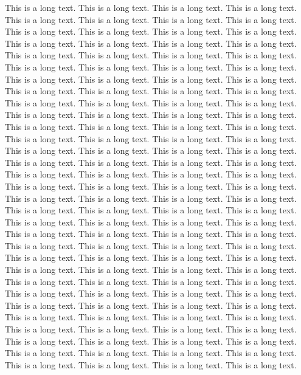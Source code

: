 \documentclass[twoside]{article}
\begin{document}
This is a long text. This is a long text.
This is a long text. This is a long text.
This is a long text. This is a long text.
This is a long text. This is a long text.
This is a long text. This is a long text.
This is a long text. This is a long text.
This is a long text. This is a long text.
This is a long text. This is a long text.
This is a long text. This is a long text.
This is a long text. This is a long text.
This is a long text. This is a long text.
This is a long text. This is a long text.
This is a long text. This is a long text.
This is a long text. This is a long text.
This is a long text. This is a long text.
This is a long text. This is a long text.
This is a long text. This is a long text.
This is a long text. This is a long text.
This is a long text. This is a long text.
This is a long text. This is a long text.
This is a long text. This is a long text.
This is a long text. This is a long text.
This is a long text. This is a long text.
This is a long text. This is a long text.
This is a long text. This is a long text.
This is a long text. This is a long text.
This is a long text. This is a long text.
This is a long text. This is a long text.
This is a long text. This is a long text.
This is a long text. This is a long text.
This is a long text. This is a long text.
This is a long text. This is a long text.
This is a long text. This is a long text.
This is a long text. This is a long text.
This is a long text. This is a long text.
This is a long text. This is a long text.
This is a long text. This is a long text.
This is a long text. This is a long text.
This is a long text. This is a long text.
This is a long text. This is a long text.
This is a long text. This is a long text.
This is a long text. This is a long text.
This is a long text. This is a long text.
This is a long text. This is a long text.
This is a long text. This is a long text.
This is a long text. This is a long text.
This is a long text. This is a long text.
This is a long text. This is a long text.
This is a long text. This is a long text.
This is a long text. This is a long text.
This is a long text. This is a long text.
This is a long text. This is a long text.
This is a long text. This is a long text.
This is a long text. This is a long text.
This is a long text. This is a long text.
This is a long text. This is a long text.
This is a long text. This is a long text.
This is a long text. This is a long text.
This is a long text. This is a long text.
This is a long text. This is a long text.
This is a long text. This is a long text.
This is a long text. This is a long text.
\end{document}
